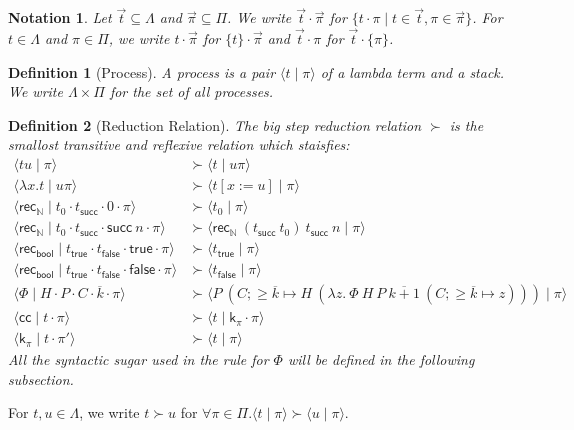 \documentclass{article}
\newcommand{\successor}{\mathsf{succ}}
\newcommand{\recN}{\mathsf{rec}_{\mathbb{N}}}
\newcommand{\true}{\mathsf{true}}
\newcommand{\false}{\mathsf{false}}
\newcommand{\recbool}{\mathsf{rec_{bool}}}
\newcommand{\proc}[2]{\langle{#1}\mid{#2}\rangle}
\newcommand{\cc}{\mathsf{cc}}
\newcommand{\cont}{\mathsf{k}}
\newtheorem{definition}{Definition}
\newtheorem{notation}{Notation}
\begin{document}
\begin{notation}
    Let $\vec{t} \subseteq \Lambda$ and $\vec{\pi} \subseteq \Pi$.
    We write $\vec{t} \cdot \vec{\pi}$ for $\{ t \cdot \pi \mid t \in \vec{t}, \pi \in \vec\pi \}$.
    For $t \in \Lambda$ and $\pi \in \Pi$, we write $t \cdot \vec\pi$ for $\{ t \} \cdot \vec\pi$ and $\vec{t} \cdot \pi$ for $\vec{t} \cdot \{ \pi \}$.
\end{notation}

\begin{definition}[Process]
    A process is a pair $\proc{t}{\pi}$ of a lambda term and a stack.
    We write $\Lambda \times \Pi$ for the set of all processes.
\end{definition}

\begin{definition}[Reduction Relation]
    The big step reduction relation $\succ$ is the smallost transitive and reflexive relation which staisfies:
    \begin{align*}
        \proc{t u}{\pi} & \succ \proc{t}{u\pi} \\
        \proc{\lambda x. t}{u\pi} & \succ \proc{t[x := u]}{\pi} \\
        \proc{\recN}{t_0 \cdot t_\successor \cdot 0 \cdot \pi} & \succ \proc{t_0}{\pi} \\
        \proc{\recN}{t_0 \cdot t_\successor \cdot \successor\ n \cdot \pi} & \succ \proc{\recN\ (t_\successor\ t_0)\ t_\successor\ n}{\pi} \\
        \proc{\recbool}{t_\true \cdot t_\false \cdot \true \cdot \pi} & \succ \proc{t_\true}{\pi} \\
        \proc{\recbool}{t_\true \cdot t_\false \cdot \false \cdot \pi} & \succ \proc{t_\false}{\pi} \\
        \proc{\Phi}{H \cdot P \cdot C \cdot \overline{k} \cdot \pi} & \succ \proc{P\ (C; \ge \overline{k} \mapsto H\ (\lambda z.\ \Phi\ H\ P\ \overline{k+1}\ (C; \ge \overline{k} \mapsto z)))}{\pi} \\
        \proc{\cc}{t \cdot \pi} & \succ \proc{t}{\cont_\pi \cdot \pi} \\
        \proc{\cont_\pi}{t \cdot \pi'} & \succ \proc{t}{\pi}
    \end{align*}
    All the syntactic sugar used in the rule for $\Phi$ will be defined in the following subsection.
\end{definition}

For $t, u \in \Lambda$, we write $t \succ u$ for $\forall \pi \in \Pi. \proc{t}{\pi} \succ \proc{u}{\pi}$.
\end{document}
